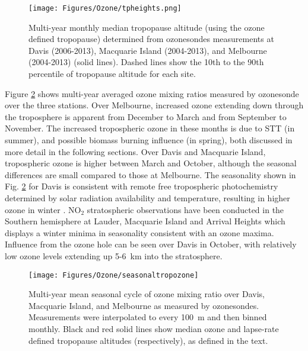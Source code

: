     \begin{figure}[t] 
      \texttt{[image: Figures/Ozone/tpheights.png]}
      \caption{%
        Multi-year monthly median tropopause altitude (using the ozone defined tropopause) determined from ozonesondes measurements at Davis (2006-2013), Macquarie Island (2004-2013), and Melbourne (2004-2013) (solid lines).
        Dashed lines show the 10th to the 90th percentile of tropopause altitude for each site.}
      \label{Ozone:fig:seasonaltpheights}
    \end{figure}
  
    Figure \ref{Ozone:fig:seasonaltropozone} shows multi-year averaged ozone mixing ratios measured by ozonesonde over the three stations.
    Over Melbourne, increased ozone extending down through the troposphere is apparent from December to March and from September to November.
    The increased tropospheric ozone in these months is due to STT (in summer), and possible biomass burning influence (in spring), both discussed in more detail in the following sections.
    Over Davis and Macquarie Island, tropospheric ozone is higher between March and October, although the seasonal differences are small compared to those at Melbourne.
    The seasonality shown in Fig. \ref{Ozone:fig:seasonaltropozone} for Davis is consistent with remote free tropospheric photochemistry determined by solar radiation availability and temperature, resulting in higher ozone in winter \parencite{Lelieveld2000}.
    NO$_2$ stratospheric observations have been conducted in the Southern hemisphere at Lauder, Macquarie Island and Arrival Heights \parencite[i.e.][]{Struthers2004} which displays a winter minima in seasonality consistent with an ozone maxima.
    Influence from the ozone hole can be seen over Davis in October, with relatively low ozone levels extending up 5-6~km into the stratosphere.
    
    \begin{figure}[t]
      \texttt{[image: Figures/Ozone/seasonaltropozone]}
      \caption{ %
        Multi-year mean seasonal cycle of ozone mixing ratio over Davis, Macquarie Island, and Melbourne as measured by ozonesondes.
        Measurements were interpolated to every 100~m and then binned monthly.
        Black and red solid lines show median ozone and lapse-rate defined tropopause altitudes (respectively), as defined in the text. }
      \label{Ozone:fig:seasonaltropozone}
    \end{figure}
  
